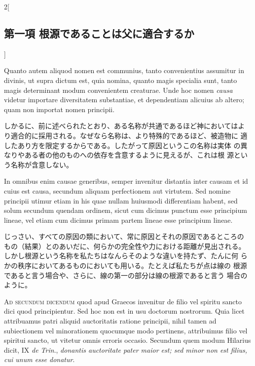 \documentclass[paper=a4paper,fontsize=10pt,jafontsize=9pt,titlepage]{jlreq}
\begin{document}
\begin{paracol}{2}[\subsection{第一項 根源であることは父に適合するか}]
\switchcolumn*


Quanto autem aliquod nomen est communius,
tanto convenientius assumitur in divinis, ut supra dictum est, quia
nomina, quanto magis specialia sunt, tanto magis determinant modum
convenientem creaturae. Unde hoc nomen {\itshape causa} videtur importare
diversitatem substantiae, et dependentiam alicuius ab altero; quam non
importat nomen principii.


\switchcolumn


しかるに、前に述べられたとおり、ある名称が共通であるほど神においてはよ
 り適合的に採用される。なぜなら名称は、より特殊的であるほど、被造物に
 適したあり方を限定するからである。したがって原因というこの名称は実体
 の異なりやある者の他のものへの依存を含意するように見えるが、これは根
 源という名称が含意しない。


\switchcolumn*


In omnibus enim causae generibus, semper
invenitur distantia inter causam et id cuius est causa, secundum
aliquam perfectionem aut virtutem. Sed nomine principii utimur etiam
in his quae nullam huiusmodi differentiam habent, sed solum secundum
quendam ordinem, sicut cum dicimus punctum esse principium lineae, vel
etiam cum dicimus primam partem lineae esse principium lineae.


\switchcolumn


じっさい、すべての原因の類において、常に原因とそれの原因であるところの
 もの（結果）とのあいだに、何らかの完全性や力における距離が見出される。
 しかし根源という名称を私たちはなんらそのような違いを持たず、たんに何
 らかの秩序においてあるものにおいても用いる。たとえば私たちが点は線の
 根源であると言う場合や、さらに、線の第一の部分は線の根源であると言う
 場合のように。


\switchcolumn*[\subsection{ad.2}]


{\scshape Ad secundum dicendum} quod apud Graecos invenitur de filio vel spiritu
sancto dici quod principientur. Sed hoc non est in usu doctorum
nostrorum. Quia licet attribuamus patri aliquid auctoritatis ratione
principii, nihil tamen ad subiectionem vel minorationem quocumque modo
pertinens, attribuimus filio vel spiritui sancto, ut vitetur omnis
erroris occasio. Secundum quem modum Hilarius dicit, IX {\itshape de Trin}.,
{\itshape donantis auctoritate pater maior est; sed minor non est filius, cui
unum esse donatur}.



\end{paracol}
\end{document}
